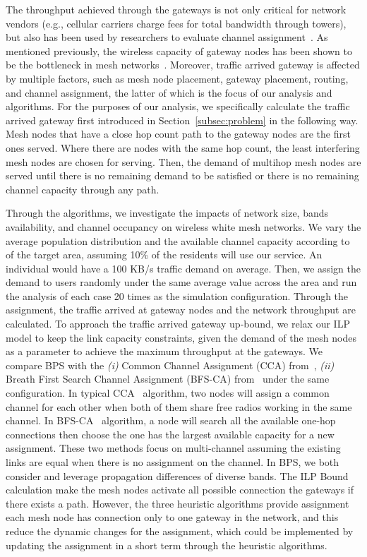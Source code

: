 The throughput achieved through the gateways is not only critical for network vendors (e.g., cellular
carriers charge fees for total bandwidth through towers), but also has been used by researchers
to evaluate channel assignment~\cite{avallone2008channel}.  As mentioned previously, the wireless
capacity of gateway nodes has been shown to be the bottleneck in mesh networks~\cite{robinson2010deploying}.
Moreover, traffic arrived gateway is affected by multiple factors, such as mesh node placement, gateway placement, 
routing, and channel assignment, the latter of which is the focus of our analysis and algorithms. 
For the purposes of our analysis, we specifically calculate the traffic arrived gateway first introduced
in Section~\ref{subsec:problem} in the following way.  Mesh nodes that have a close hop count path to the gateway
nodes are the first ones served. Where there are nodes with the same hop count, the least interfering
mesh nodes are chosen for serving. Then, the demand of multihop mesh nodes are served 
until there is no remaining demand to be satisfied or there is no remaining channel capacity through any path.

Through the algorithms, we investigate the impacts of network size, bands availability, and channel occupancy
on wireless white mesh networks. We vary the average population distribution and the available channel 
capacity according to~\cite{pcuiwinmee} of the target area, assuming 10\% of the residents will use
our service. An individual would have a 100 KB/s traffic demand on average. Then, we assign the demand 
to users randomly under the same average value across the area and run the analysis of each case 20 times 
as the simulation configuration. Through the assignment, the traffic arrived at gateway nodes and the 
network throughput are calculated. To approach the traffic arrived gateway up-bound, we relax our ILP 
model to keep the link capacity constraints, given the demand of the mesh nodes as a parameter to 
achieve the maximum throughput at the gateways. 
We compare BPS with the 
{\it (i)} Common Channel Assignment (CCA) from~\cite{draves2004routing},
{\it (ii)} Breath First Search Channel Assignment (BFS-CA) from~\cite{tang2005interference}
under the same configuration.
In typical CCA~\cite{draves2004routing} algorithm, two nodes will assign a common channel 
for each other when both of them share free radios working in the same channel. 
In BFS-CA~\cite{tang2005interference} algorithm, a node will search all the 
available one-hop connections then choose the one has the largest available capacity for a new assignment. 
These two methods focus on multi-channel assuming the existing links are equal 
when there is no assignment on the channel. In BPS, we both consider and 
leverage propagation differences of diverse bands.
The ILP Bound calculation make the mesh nodes activate all possible connection 
the gateways if there exists a path. However, the three heuristic algorithms 
provide assignment each mesh node has connection only to one gateway in the network, and this reduce 
the dynamic changes for the assignment, which could be implemented by updating the assignment in a 
short term through the heuristic algorithms.

